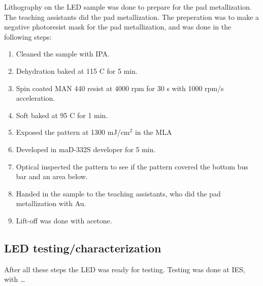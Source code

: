 Lithography on the LED sample was done to prepare for the pad metallization.
The teaching assistants did the pad metallization.
The preperation was to make a negative photoresist mask for the pad metallization, and was done in the following steps:
\begin{enumerate}
    \item Cleaned the sample with IPA.
    \item Dehydration baked at 115 \textdegree C for 5 min.
    \item Spin coated MAN 440 resist at 4000 rpm for 30 s with 1000 rpm/s acceleration.
    \item Soft baked at 95 \textdegree C for 1 min.
    \item Exposed the pattern at 1300 mJ/cm$^2$ in the MLA
    \item Developed in maD-332S developer for 5 min.
    \item Optical inspected the pattern to see if the pattern covered the bottom bus bar and an area below.
    \item Handed in the sample to the teaching assistants, who did the pad metallization with Au.
    \item Lift-off was done with acetone.
\end{enumerate}


\subsection{LED testing/characterization}
\label{methods:LED_testing}
After all these steps the LED was ready for testing.
Testing was done at IES, with \dots
